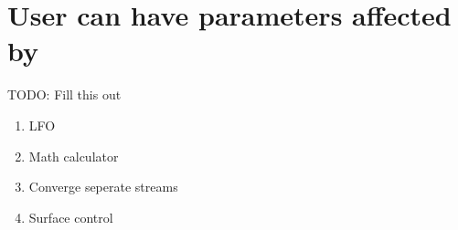 \section{User can have parameters affected by}
TODO: Fill this out

\begin{enumerate}
	\item LFO

	\item Math calculator 

	\item Converge seperate streams

	\item Surface control
\end{enumerate}
